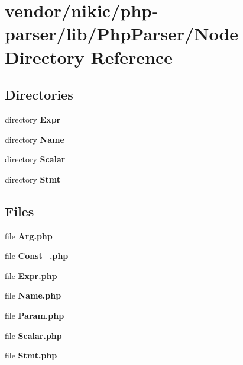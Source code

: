 \section{vendor/nikic/php-\/parser/lib/\+Php\+Parser/\+Node Directory Reference}
\label{dir_07124e4a1f72d462c839ed84d518556d}
\subsection*{Directories}
\begin{DoxyCompactItemize}
\item 
directory {\bf Expr}
\item 
directory {\bf Name}
\item 
directory {\bf Scalar}
\item 
directory {\bf Stmt}
\end{DoxyCompactItemize}
\subsection*{Files}
\begin{DoxyCompactItemize}
\item 
file {\bf Arg.\+php}
\item 
file {\bf Const\+\_\+.\+php}
\item 
file {\bf Expr.\+php}
\item 
file {\bf Name.\+php}
\item 
file {\bf Param.\+php}
\item 
file {\bf Scalar.\+php}
\item 
file {\bf Stmt.\+php}
\end{DoxyCompactItemize}
